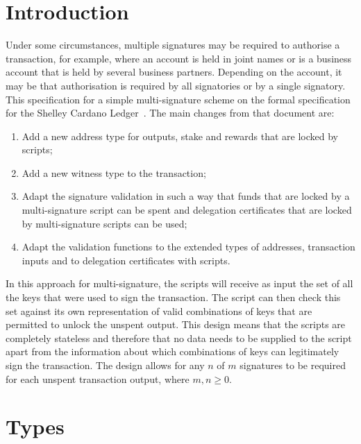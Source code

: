 \documentclass[11pt,a4paper,dvipsnames]{article}
\newcommand{\khcomment}[1]{\todo[color=blue!20]{KH: #1}}
\theoremstyle{definition}
\begin{document}


\section{Introduction}
\label{sec:introduction}

Under some circumstances, multiple signatures may be required to authorise a transaction, for example, where an account
is held in joint names or is a business account that is held by several business partners.
Depending on the account, it may be that authorisation is required by all signatories or by a single signatory.
This specification for a simple multi-signature scheme
on the formal specification for the Shelley Cardano Ledger~\cite{shelley_spec}.
The main changes from that document are:

\begin{enumerate}
\item Add a new address type for outputs, stake and rewards that are locked by scripts;
\item Add a new witness type to the transaction;
\item Adapt the signature validation in such a way that funds that are locked\khcomment{reserved?} by a
  multi-signature script can be spent and delegation certificates that are locked by
  multi-signature scripts can be used;
\item Adapt the validation functions to the extended types of
  addresses, transaction inputs and to delegation certificates with scripts.
\end{enumerate}

In this approach for multi-signature, the scripts will receive as input the set of
all the keys that were used to sign the transaction. The script can then check this set
against its own representation of valid combinations of keys that are permitted to unlock the
unspent output.
%
This design means that the scripts are completely stateless and therefore that no data needs to be
supplied to the script apart from the information about which combinations of keys
can legitimately sign the transaction. The design allows for any $n$ of $m$
signatures to be required for each unspent transaction output, where $m, n \ge 0$.

\section{Types}
\label{sec:types}
\end{document}
